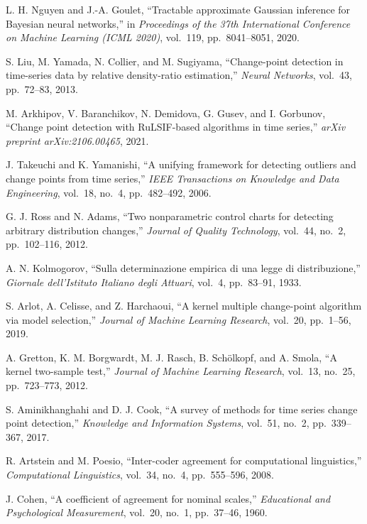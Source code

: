 \documentclass[journal,article,submit,pdftex,moreauthors]{Definitions/mdpi}
\begin{document}
L. H. Nguyen and J.-A. Goulet, ``Tractable approximate Gaussian inference for Bayesian neural networks,'' in \textit{Proceedings of the 37th International Conference on Machine Learning (ICML 2020)}, vol.~119, pp.~8041--8051, 2020.

S. Liu, M. Yamada, N. Collier, and M. Sugiyama, ``Change-point detection in time-series data by relative density-ratio estimation,'' \textit{Neural Networks}, vol.~43, pp.~72--83, 2013.

M. Arkhipov, V. Baranchikov, N. Demidova, G. Gusev, and I. Gorbunov, ``Change point detection with RuLSIF-based algorithms in time series,'' \textit{arXiv preprint arXiv:2106.00465}, 2021.

J. Takeuchi and K. Yamanishi, ``A unifying framework for detecting outliers and change points from time series,'' \textit{IEEE Transactions on Knowledge and Data Engineering}, vol.~18, no.~4, pp.~482--492, 2006.

G. J. Ross and N. Adams, ``Two nonparametric control charts for detecting arbitrary distribution changes,'' \textit{Journal of Quality Technology}, vol.~44, no.~2, pp.~102--116, 2012.

A. N. Kolmogorov, ``Sulla determinazione empirica di una legge di distribuzione,'' \textit{Giornale dell’Istituto Italiano degli Attuari}, vol.~4, pp.~83--91, 1933.

S. Arlot, A. Celisse, and Z. Harchaoui, ``A kernel multiple change-point algorithm via model selection,'' \textit{Journal of Machine Learning Research}, vol.~20, pp.~1--56, 2019.

A. Gretton, K. M. Borgwardt, M. J. Rasch, B. Schölkopf, and A. Smola, ``A kernel two-sample test,'' \textit{Journal of Machine Learning Research}, vol.~13, no.~25, pp.~723--773, 2012.

S. Aminikhanghahi and D. J. Cook, ``A survey of methods for time series change point detection,'' \textit{Knowledge and Information Systems}, vol.~51, no.~2, pp.~339--367, 2017.

R. Artstein and M. Poesio, ``Inter-coder agreement for computational linguistics,'' \textit{Computational Linguistics}, vol.~34, no.~4, pp.~555--596, 2008.

J. Cohen, ``A coefficient of agreement for nominal scales,'' \textit{Educational and Psychological Measurement}, vol.~20, no.~1, pp.~37--46, 1960.
\end{document}
